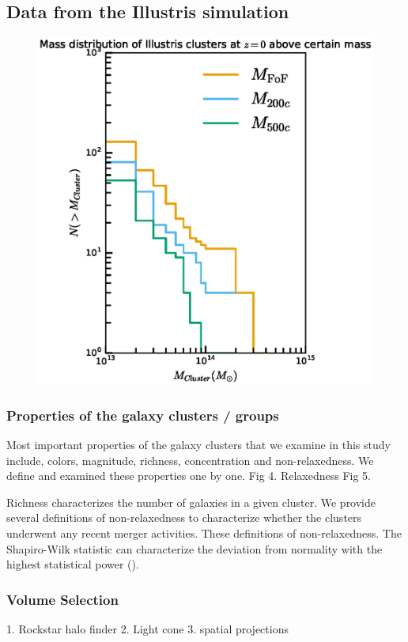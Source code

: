 \documentclass[letterpaper,useAMS,usenatbib]{mn2e}
\begin{document}
\subsection{Data from the Illustris simulation} 
\begin{figure}
	\includegraphics[width=.95\linewidth]{clusterMassDist.eps}
	\caption{
		\label{fig:config}}
\end{figure}


\subsubsection{Properties of the galaxy clusters / groups}
Most important properties of the galaxy clusters that we examine in this
study include, colors, magnitude, richness, concentration and non-relaxedness. We define
and examined these properties one by one. 
Fig 4. Relaxedness 
Fig 5. 

Richness characterizes the number of galaxies in a given cluster.
We provide several definitions of non-relaxedness to characterize whether
the clusters underwent any recent merger activities. These definitions of
non-relaxedness.
The Shapiro-Wilk statistic can characterize the deviation from normality
with the highest statistical power ().


\subsubsection{Volume Selection}
1. Rockstar halo finder 
2. Light cone 
3. spatial projections 
\end{document}
